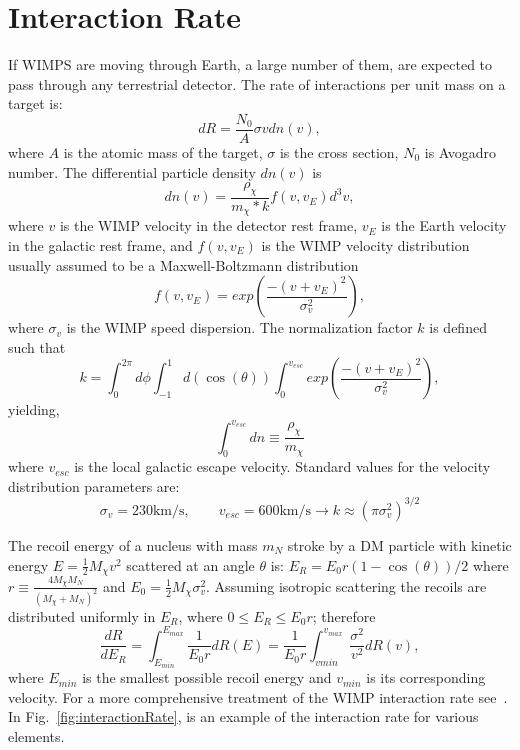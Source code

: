 \section{Interaction Rate}
If WIMPS are moving through Earth, a large number of them, are expected to pass through any terrestrial detector. The rate of interactions per unit mass on a target is:
\begin{equation}
dR = \frac{N_0}{A}\sigma v dn(v),
\end{equation} 
where $A$ is the atomic mass of the target, $\sigma$ is the cross section, $N_0$ is Avogadro number. The differential particle density $dn(v)$ is
\begin{equation}
dn(v) = \frac{\rho_{\chi}}{m_{\chi}*k} f(v,v_E)d^3 v,
\end{equation}
where $v$ is the WIMP velocity in the detector rest frame, $v_E$ is the Earth velocity in the galactic rest frame, and $f(v,v_E)$ is the WIMP velocity distribution usually assumed to be a Maxwell-Boltzmann distribution
\begin{equation}
f(v,v_E) = exp\left(\frac{-(v+v_E)^2}{\sigma_v ^2}\right),
\end{equation} 
where $\sigma_v$ is the WIMP speed dispersion. The normalization factor $k$ is defined such that
\begin{equation}
k = \int_0^{2\pi}d\phi \int_{-1}^1d(\cos(\theta)) \int_0^{v_{esc}} exp\left(\frac{-(v+v_E)^2}{\sigma_v ^2}\right),
\end{equation}
yielding,
\begin{equation}
\int_0^{v_{esc}} dn \equiv \frac{\rho_\chi}{m_\chi} 
\end{equation}
where $v_{esc}$ is the  local galactic escape velocity. Standard values for the velocity distribution parameters are:
\begin{equation}
\sigma_v = 230\mathrm{km/s}, \qquad v_{esc} = 600\mathrm{km/s} \rightarrow k \approx (\pi \sigma_v^2)^{3/2}
\end{equation} 

The recoil energy of a nucleus with mass $m_N$ stroke by a DM particle with kinetic energy $E = \frac{1}{2}M_\chi v^2$ scattered at an angle $\theta$ is: $E_R = E_0r(1-\cos(\theta))/2$ where $r \equiv \frac{4M_\chi M_N}{(M_\chi + M_N)^2}$ and $E_0=\frac{1}{2}M_\chi\sigma_v^2$. Assuming isotropic scattering the recoils are distributed uniformly in $E_R$, where $0 \leq E_R \leq E_0 r$; therefore
\begin{equation}
\frac{dR}{dE_R} = \int_{E_{min}}^{E_{max}} \frac{1}{E_0 r}dR(E) = \frac{1}{E_0r}\int_{v{min}}^{v_{max}}\frac{\sigma^2}{v^2}dR(v),
\end{equation} 
where $E_{min}$ is the smallest possible recoil energy and $v_{min}$ is its corresponding velocity. For a more comprehensive treatment of the WIMP interaction rate see~\cite{LEWIN}. In Fig.~\ref{fig:interactionRate}, is an example of the interaction rate for various elements.


